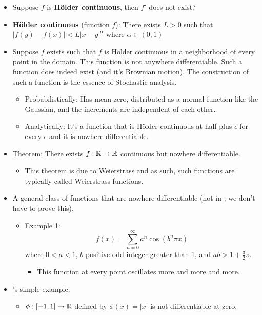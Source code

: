 \documentclass[../../notes.tex]{subfiles}
\begin{document}
\begin{itemize}
    \item Suppose $f$ is \textbf{H\"{o}lder continuous}, then $f'$ does not exist?
    \item \textbf{H\"{o}lder continuous} (function $f$): There exists $L>0$ such that $|f(y)-f(x)|<L|x-y|^\alpha$ where $\alpha\in(0,1)$
    \item Suppose $f$ exists such that $f$ is H\"{o}lder continuous in a neighborhood of every point in the domain. This function is not anywhere differentiable. Such a function does indeed exist (and it's Brownian motion). The construction of such a function is the essence of Stochastic analysis.
    \begin{itemize}
        \item Probabilistically: Has mean zero, distributed as a normal function like the Gaussian, and the increments are independent of each other.
        \item Analytically: It's a function that is H\"{o}lder continuous at half plus $\epsilon$ for every $\epsilon$ and it is nowhere differentiable.
    \end{itemize}
    \item Theorem: There exists $f:\mathbb{R}\to\mathbb{R}$ continuous but nowhere differentiable.
    \begin{itemize}
        \item This theorem is due to Weierstrass and as such, such functions are typically called Weierstrass functions.
    \end{itemize}
    \item A general class of functions that are nowhere differentiable (not in \textcite{bib:Rudin}; we don't have to prove this).
    \begin{itemize}
        \item Example 1:
        \begin{equation*}
            f(x) = \sum_{n=0}^\infty a^n\cos(b^n\pi x)
        \end{equation*}
        where $0<a<1$, $b$ positive odd integer greater than 1, and $ab>1+\frac{3}{2}\pi$.
        \begin{itemize}
            \item This function at every point oscillates more and more and more.
        \end{itemize}
    \end{itemize}
    \item \textcite{bib:Rudin}'s simple example.
    \begin{itemize}
        \item $\phi:[-1,1]\to\mathbb{R}$ defined by $\phi(x)=|x|$ is not differentiable at zero.

\end{itemize}
\end{itemize}
\end{document}
